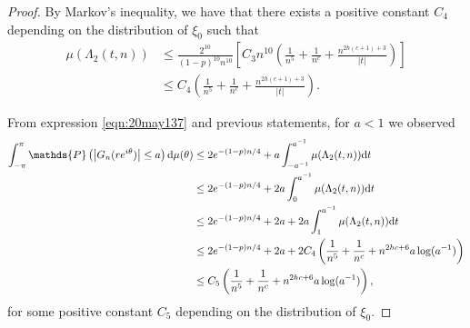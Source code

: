 \documentclass[12pt]{amsart}
\theoremstyle{plain}
\numberwithin{equation}{section}
\renewcommand{\Pr}{\mathbb{P}}
\newcommand{\<}{\langle}
\renewcommand{\>}{\rangle}
\newcommand{\PP}[1]{\left(#1\right)}
\newcommand{\CC}[1]{\left[#1\right]}
\newcommand{\dd}{\textnormal{d}}
\newcommand{\abs}[1]{\left|#1\right|}
\renewcommand{\Pr}[1]{\mathds{P}\left(#1\right)}
\begin{document}
\begin{proof}
By Markov's inequality, we have that there exists a positive constant $C_4$ depending on the distribution of $\xi_0$ such that
\begin{align*}
\mu(\Lambda_2(t,n)) & \leq \frac{2^{10}}{(1-p)^{10} n^{10}} \CC{ C_3 n^{10} \PP{\frac{1}{n^5} + \frac{1}{n^c} + \frac{ n^{2h(c+1) + 3}}{\abs{t}}} } \\
& \leq C_4 \PP{\frac{1}{n^5} + \frac{1}{n^c} + \frac{ n^{2h(c+1) + 3}}{\abs{t}}}.
\end{align*}

From expression \ref{eqn:20may137} and previous statements, for $a<1$ we observed
\begin{align*}
 \int_{-\pi}^{\pi} \Pr{\abs{G_n(re^{i\theta})} \leq a } \dd \mu(\theta) & \leq 2e^{-(1-p)n/4} + a\int_{-a^{-1}}^{a^{-1}} \mu(\Lambda_2(t,n)) \dd t \\
 & \leq 2e^{-(1-p)n/4} + 2a \int_{0}^{a^{-1}} \mu(\Lambda_2(t,n)) \dd t \\
 & \leq 2e^{-(1-p)n/4} + 2a + 2a\int_{1}^{a^{-1}} \mu(\Lambda_2(t,n)) \dd t \\
 & \leq 2e^{-(1-p)n/4} + 2a + 2C_4\PP{ \frac{1}{n^5} + \frac{1}{n^c} + n^{2hc+6} a\log(a^{-1}) } \\
 & \leq C_5 \PP{ \frac{1}{n^5} + \frac{1}{n^c} + n^{2hc+6} a\log(a^{-1}) },
\end{align*}
for some positive constant $C_5$ depending on the distribution of $\xi_0$.

\end{proof}




\end{document}
